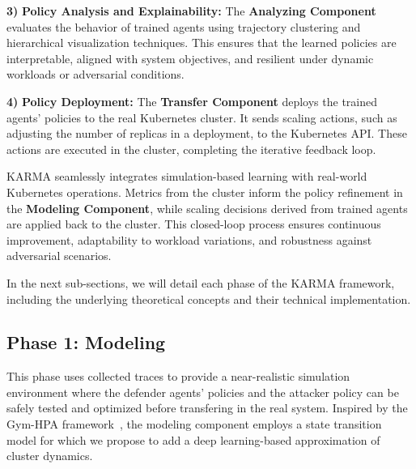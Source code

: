\documentclass[conference]{IEEEtran}
\begin{document}
\textbf{3)} \textbf{Policy Analysis and Explainability:} The \textbf{Analyzing Component} evaluates the behavior of trained agents using trajectory clustering and hierarchical visualization techniques. This ensures that the learned policies are interpretable, aligned with system objectives, and resilient under dynamic workloads or adversarial conditions.
    
\textbf{4)} \textbf{Policy Deployment:} The \textbf{Transfer Component} deploys the trained agents' policies to the real Kubernetes cluster. It sends scaling actions, such as adjusting the number of replicas in a deployment, to the Kubernetes API. These actions are executed in the cluster, completing the iterative feedback loop.

KARMA seamlessly integrates simulation-based learning with real-world Kubernetes operations. Metrics from the cluster inform the policy refinement in the \textbf{Modeling Component}, while scaling decisions derived from trained agents are applied back to the cluster. This closed-loop process ensures continuous improvement, adaptability to workload variations, and robustness against adversarial scenarios.

In the next sub-sections, we will detail each phase of the KARMA framework, including the underlying theoretical concepts and their technical implementation.



\subsection{Phase 1: Modeling}


This phase uses collected traces to provide a near-realistic simulation environment where the defender agents' policies and the attacker policy can be safely tested and optimized before transfering in the real system. Inspired by the Gym-HPA framework~\cite{GymHPA}, the modeling component employs a state transition model for which we propose to add a deep learning-based approximation of cluster dynamics.
\end{document}
